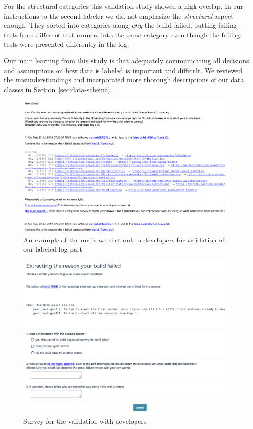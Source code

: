 \documentclass[\myrootdir/main.tex]{subfiles}
\begin{document}
For the structural categories this validation study showed a high overlap.
In our instructions to the second labeler we did not emphasize the \emph{structural} aspect enough.
They sorted into categories along \emph{why} the build failed, putting failing tests from different test runners into the same category even though the failing tests were presented differently in the log.

Our main learning from this study is that adequately communicating all decisions and assumptions on how data is labeled is important and difficult.
We reviewed the misunderstandings and incorporated more thorough descriptions of our data classes in Section~\ref{sec:data-schema}.

\begin{figure}[h]
	\centering
	\includegraphics[width=\textwidth, clip]{img/dev-mail.png}
	\caption{An example of the mails we sent out to developers for validation of our labeled log part}
	\label{fig:dev-mail}
\end{figure}
\begin{figure}[h]
	\centering
	\includegraphics[width=\textwidth, clip]{img/dev-survey.png}
	\caption{Survey for the validation with developers}
	\label{fig:dev-survey}
\end{figure}
\end{document}
